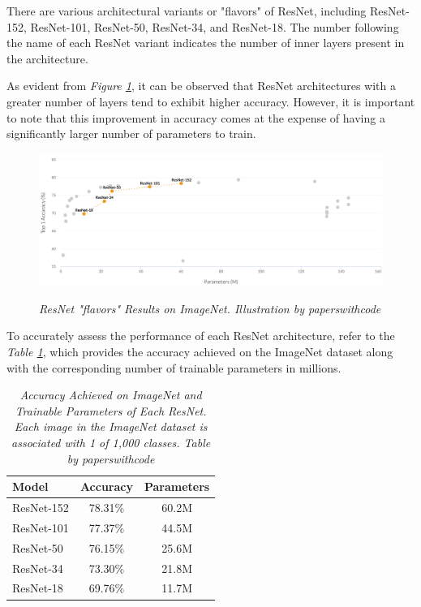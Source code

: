 There are various architectural variants or "flavors" of ResNet, including
ResNet-152,  ResNet-101,  ResNet-50,  ResNet-34, and  ResNet-18. The
number following the name of each ResNet variant indicates the number of inner
layers present in the architecture.

\newpage

As evident from \textit{Figure \ref{fig:resnet}}, it can be observed that
ResNet architectures with a greater number of layers tend to exhibit higher
accuracy. However, it is important to note that this improvement in accuracy
comes at the expense of having a significantly larger number of parameters to
train.


\begin{figure}[H]
  \begin{adjustbox}{width=\textwidth, trim={0pt 0pt 1cm 0pt}, clip}
    \centering
    \includegraphics[width=\textwidth]{imatges/preliminaries/ResNetImageNet.png}
  \end{adjustbox}
  \caption[ResNet "flavors" Results on ImageNet]{\textit{ResNet "flavors" Results on ImageNet. Illustration by paperswithcode}}
  {\label{fig:resnet}}
\end{figure}

To accurately assess the performance of each ResNet architecture, refer to the
\textit{Table \ref{table:resnet}}, which provides the accuracy achieved on the
ImageNet dataset along with the corresponding number of trainable parameters in
millions.

\begin{table}[H]
  \centering
  \begin{tabular}{lcc}
    \toprule
    \textbf{Model} & \textbf{Accuracy} & \textbf{Parameters} \\
    \midrule
    ResNet-152 & 78.31\% & 60.2M \\
    ResNet-101 & 77.37\% & 44.5M \\
    ResNet-50 & 76.15\% & 25.6M \\
    ResNet-34 & 73.30\% & 21.8M \\
    ResNet-18 & 69.76\% & 11.7M \\
    \bottomrule
  \end{tabular}
  \caption[Accuracy Achieved on ImageNet and Trainable Parameters of Each ResNet.]
  {\textit{Accuracy Achieved on ImageNet and Trainable Parameters of Each ResNet.
  Each image in the ImageNet dataset is associated with 1 of 1,000 classes. Table by paperswithcode}}
  {\label{table:resnet}}
\end{table}

